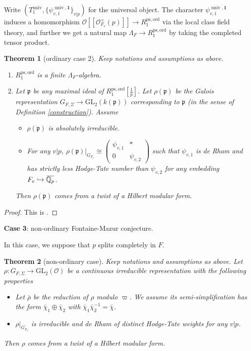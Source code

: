 \documentclass[a4paper, 12pt]{amsart}
\newtheorem{thm}{Theorem}[subsection]
\def\ps{\mathrm{ps}}
\def\ord{\mathrm{ord}}
\newcommand{\Q}{\mathbb{Q}}
\newcommand{\GL}{\mathrm{GL}}
\newcommand{\cO}{\mathcal{O}}
\newcommand{\kp}{\mathfrak{p}}
\newcommand{\overbar}[1]{\mkern 1.5mu\overline{\mkern-1.5mu#1\mkern-1.5mu}\mkern 1.5mu}
\begin{document}
    Write $(T_1^{\operatorname{univ}}, \{\psi^{\operatorname{univ}, \mathbf{1}}_{v,1}\}_{v|p}) $ for the universal object. The character $ \psi^{\operatorname{univ}, \mathbf{1}}_{v,1}$ induces a homomorphism $\cO[[\cO_{F_v}^\times(p)]]\to R^{\ps,\ord}_1 $ via the local class field theory, and further we get a natural map $\Lambda_F \to R^{\ps,\ord}_1 $ by taking the completed tensor product.
    
     \begin{thm}[ordinary case 2] \label{ord2} Keep notations and assumptions as above.
    	\begin{enumerate}
    		\item $R^{\ps,\ord}_1$ is a finite $\Lambda_F$-algebra.
    		\item Let $\kp$ be any maximal ideal of $R^{\ps,\ord}_1[\frac{1}{p}]$. Let $\rho(\kp)$ be the Galois representation $G_{F,\Sigma}\to\GL_2(k(\kp))$ corresponding to $\kp$ (in the sense of Definition \ref{construction}). Assume 
    		\begin{itemize}
    			\item $\rho(\kp)$ is absolutely irreducible.
    			\item For any $v|p$, $\rho(\kp)|_{G_{F_v}}\cong\begin{pmatrix}\psi_{v,1} & *\\ 0 & \psi_{v,2}\end{pmatrix}$ such that $\psi_{v,1}$ is de Rham and has strictly less Hodge-Tate number than $\psi_{v,2}$ for any embedding $F_v\hookrightarrow \overbar{\Q_p}$.
    		\end{itemize}
    		Then $\rho(\kp)$ comes from a twist of a Hilbert modular form.
    	\end{enumerate}
    \end{thm}
    
    \begin{proof}
    	This is \cite[Theorem 6.1.1]{pan2022fontaine}.
    \end{proof}
    
    \textbf{Case 3}: non-ordinary Fontaine-Mazur conjecture.
    
    In this case, we suppose that $p$ splits completely in $F$. 
    
    \begin{thm} [non-ordinary case] \label{non-ord} Keep notations and assumptions as above.
     Let
    	$\rho:G_{F, \Sigma} \to \GL_2(\cO)$
    	be a continuous irreducible representation with the following properties
    	\begin{itemize}
    		\item Let $\bar{\rho}$ be the reduction of $\rho$ modulo $\varpi$. We assume its semi-simplification has the form $\bar{\chi}_1\oplus\bar{\chi}_2$ with $\bar{\chi}_1\bar{\chi}_2^{-1}=\bar{\chi}$.
    		\item $\rho|_{G_{F_v}}$ is irreducible and de Rham of distinct Hodge-Tate weights for any $v|p$. 
    	\end{itemize}
    	Then $\rho$ comes from a twist of a Hilbert modular form.
    \end{thm}
    
\end{document}
